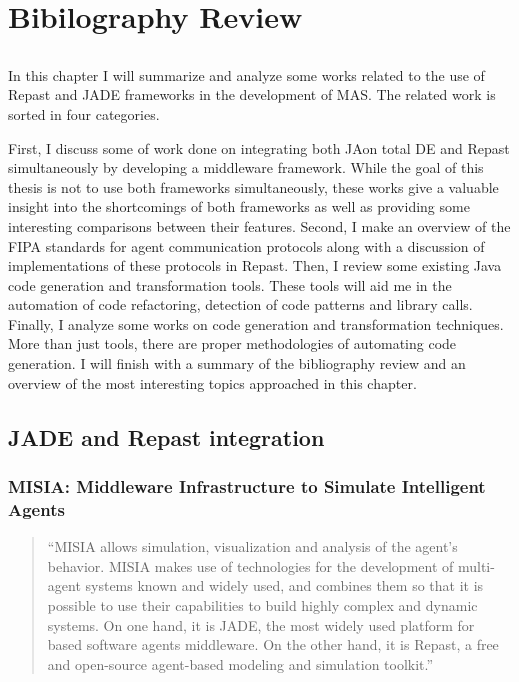\chapter{Bibilography Review} \label{chap:sota}

\section*{}



In this chapter I will summarize and analyze some works related to the use of Repast and JADE frameworks in the development of MAS. The related
work is sorted in four categories.

First, I discuss some of work done on integrating both JAon total DE and Repast simultaneously by developing a middleware framework.  While the goal of this thesis is not to use both frameworks simultaneously, these works give a valuable insight into the shortcomings of both frameworks as well as providing some interesting comparisons between their features.
Second, I make an overview of the FIPA standards for agent communication protocols along with a discussion of implementations of these protocols in Repast.
Then, I review some existing Java code generation and transformation tools. These tools will aid me in the automation of code refactoring, detection of code patterns and library calls.
Finally, I analyze some works on code generation and transformation techniques.
More than just tools, there are proper methodologies of automating code generation.
I will finish with a summary of the bibliography review and an overview of the most interesting topics approached in this chapter.

\section{JADE and Repast integration}


\subsection{MISIA: Middleware Infrastructure to Simulate Intelligent Agents}
\begin{quote}
	``MISIA allows simulation, visualization and analysis of the agent’s behavior. MISIA makes use of technologies for the development of multi-agent systems known and widely used, and combines them so that it is possible to use their capabilities to build highly complex and dynamic systems. On one hand, it is JADE, the most widely used platform for based software agents middleware. On the other hand, it is Repast, a free and open-source agent-based modeling and simulation toolkit.'' \cite{garcia2011misia}
\end{quote}

